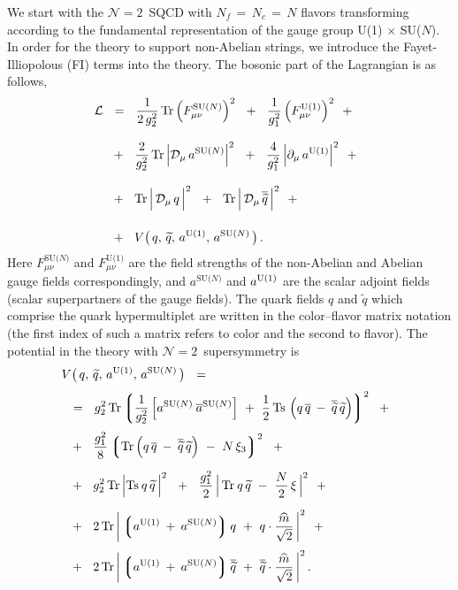 \documentclass[12pt]{article}
\newcommand{\ntwo}{${\mathcal N}=2$}
\newcommand{\p}{\partial}
\newcommand{\wt}{\widetilde}
\newcommand{\ov}{\overline}
\newcommand{\md}{\mathcal{D}}
\newcommand{\ml}{\mathcal{L}}
\newcommand{\lgr}{\left\lgroup}
\newcommand{\rgr}{\right\rgroup}
\newcommand{\aU}{a^{\rm U(1)}}
\newcommand{\aN}{a^\text{SU($N$)}}
\newcommand{\baN}{\ov{a}{}^\text{SU($N$)}}
\newcommand{\qt}{\wt{q}}
\newcommand{\bq}{\ov{q}}
\newcommand{\bqt}{\overline{\widetilde{q}}}
\newcommand{\Tr}{\text{Tr}}
\newcommand{\Ts}{\text{Ts}}
\newcommand{\mhat}{\widehat{m}}
\begin{document}
	We start with the \ntwo\, SQCD with $ N_f \,=\, N_c \,=\, N $ flavors transforming according to the  fundamental
	representation of the gauge group U(1)$\,\times\,$SU($N$).
	In order for the theory to support  non-Abelian strings, we introduce the Fayet-Illiopolous (FI) terms into the
	theory.
	The bosonic part of the Lagrangian is as follows,
\begin{align}
%
\notag
	\ml    & ~~=~~
	\frac{1}{2\, g_2^2}\, \Tr\, \Big( F_{\mu\nu}^\text{SU($N$)} \Big)^2  ~~+~~
	\frac{1}{g_1^2}\, \Big( F_{\mu\nu}^\text{U(1)} \Big)^2  ~~+~~
	\\[3mm]
%
\notag
	&
	~~+~~
	\frac{2}{g_2^2}\, \Tr\, \Big| \md_\mu\, \aN \Big|^2  ~~+~~
	\frac{4}{g_1^2}\, \Big| \p_\mu\, \aU \Big|^2  ~~+~~
	\\[3mm]
%
\label{bulk}
	&
	~~+~~
	\Tr\, \Big|\, \md_\mu\, q \,\Big|^2  ~~+~~
	\Tr\, \Big|\, \md_\mu\, \bqt \,\Big|^2
	~~+~~
	\\[4mm]
%
\notag
	&
	~~+~~
	V \big(\, q,\, \qt,\, \aU,\, \aN \,\big) \,.
\end{align}
	Here $ F_{\mu\nu}^\text{SU($N$)} $ and $ F_{\mu\nu}^\text{U(1)} $ are the field strengths
	of the non-Abelian and Abelian gauge fields correspondingly, 
	and $ \aN $ and $ \aU $ are the scalar adjoint fields (scalar superpartners of the gauge fields).
	The quark fields $ q $ and $ \qt $ which comprise the quark hypermultiplet are written in the
	color--flavor matrix notation (the first index of such a matrix refers to color and the second
	to flavor).
	The potential in the theory with \ntwo\, supersymmetry is
\begin{align}
%
\notag
	&
	V \big(\, q,\, \qt,\, \aU,\, \aN \,\big) ~~=~~ 
	\\[1mm]
%
\notag
	&
	~~=~~
	g_2^2\, \Tr \lgr \frac{1}{g_2^2}\, \Big[ \aN\: \baN \Big]  ~+~  \frac{1}{2}\, \Ts\, \left( q\,\bq \:-\: \bqt\,\qt \right) \rgr^2 
	~~+~~
	\\[1mm]
%
\notag
	&
	~~+~~
	\frac{g_1^2}{8} \lgr  \Tr \left( q\,\bq \:-\: \bqt\,\qt \right) ~-~ N\,\xi_3  \rgr^2
	~~+~~
	\\[2mm]
%
\label{pot}
	&
	~~+~~
	g_2^2\, \Tr\, \Big| \Ts\: q\,\qt \,\Big|^2
	~~+~~
	\frac{g_1^2}{2}\, \Big|\, \Tr\: q\,\qt  ~-~  \frac{N}{2}\,\xi \,\Big|^2
	~~+~~
	\\[2mm]
%
\notag
	&
	~~+~~
	2\, \Tr\, \bigg| \lgr \aU \:+\: \aN \rgr q  ~+~  q \cdot \frac{\mhat}{\sqrt{2}} \,\bigg|^2
	~~+~~
	\\[1mm]
%
\notag
	&
	~~+~~
	2\, \Tr\, \bigg| \lgr \aU \:+\: \aN \rgr \bqt  ~+~  \bqt \cdot \frac{\mhat}{\sqrt{2}} \,\bigg|^2
	\,.
\end{align}
\end{document}
